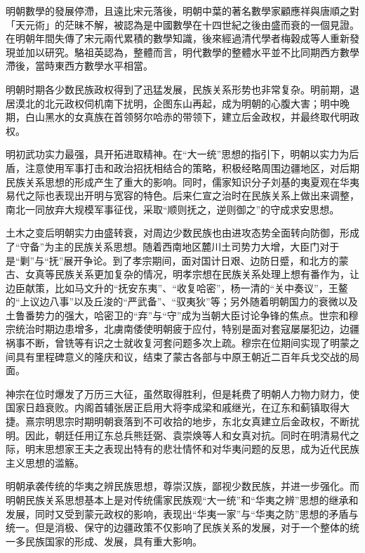 明朝數學的發展停滯，且遠比宋元落後，明朝中葉的著名數學家顧應祥與唐順之對「天元術」的茫昧不解，被認為是中國數學在十四世紀之後由盛而衰的一個見證。在明朝年間失傳了宋元兩代累積的數學知識，後來經過清代學者梅穀成等人重新發現並加以研究。駱祖英認為，整體而言，明代數學的整體水平並不比同期西方數學滯後，當時東西方數學水平相當。

明朝时期各少数民族政权得到了迅猛发展，民族关系形势也非常复杂。明前期，退居漠北的北元政权伺机南下扰明，企图东山再起，成为明朝的心腹大害；明中晚期，白山黑水的女真族在首领努尔哈赤的带领下，建立后金政权，并最终取代明政权。

明初武功实力最强，具开拓进取精神。在“大一统”思想的指引下，明朝以实力为后盾，注意使用军事打击和政治招抚相结合的策略，积极经略周围边疆地区，对后期民族关系思想的形成产生了重大的影响。同时，儒家知识分子刘基的夷夏观在华夷易代之际也表现出开明与宽容的特色。后来仁宣之治时在民族关系上做出来调整，南北一同放弃大规模军事征伐，采取“顺则抚之，逆则御之”的守成求安思想。

土木之变后明朝实力由盛转衰，对周边少数民族也由进攻态势全面转向防御，形成了“守备”为主的民族关系思想。随着西南地区麓川土司势力大增，大臣门对于是“剿”与“抚”展开争论。到了孝宗期间，面对国计日艰、边防日蹙，和北方的蒙古、女真等民族关系更加复杂的情况，明孝宗想在民族关系处理上想有番作为，让边臣献策，比如马文升的“抚安东夷”、“收复哈密”，杨一清的“关中奏议”，王鳌的“上议边八事”以及丘浚的“严武备”、“驭夷狄”等；另外随着明朝国力的衰微以及土鲁番势力的强大，哈密卫的“弃”与“守”成为当朝大臣讨论争锋的焦点。世宗和穆宗统治时期边患增多，北虜南倭使明朝疲于应付，特别是面对套寇屡屡犯边，边疆祸事不断，曾铣等有识之士就收复河套问题多次上疏。穆宗在位期间实现了明蒙之间具有里程碑意义的隆庆和议，结束了蒙古各部与中原王朝近二百年兵戈交战的局面。

神宗在位时爆发了万历三大征，虽然取得胜利，但是耗费了明朝人力物力财力，使国家日趋衰败。内阁首辅张居正启用大将李成梁和戚继光，在辽东和蓟镇取得大捷。熹宗明思宗时期明朝衰落到不可收拾的地步，东北女真建立后金政权，不断扰明。因此，朝廷任用辽东总兵熊廷弼、袁崇焕等人和女真对抗。同时在明清易代之际，明末思想家王夫之表现出特有的悲壮情怀和对华夷问题的反思，成为近代民族主义思想的滥觞。

明朝承袭传统的华夷之辨民族思想，尊崇汉族，鄙视少数民族，并进一步强化。而明朝民族关系思想基本上是对传统儒家民族观“大一统”和“华夷之辨”思想的继承和发展，同时又受到蒙元政权的影响，表现出“华夷一家”与“华夷之防”思想的矛盾与统一。但是消极、保守的边疆政策不仅影响了民族关系的发展，对于一个整体的统一多民族国家的形成、发展，具有重大影响。

